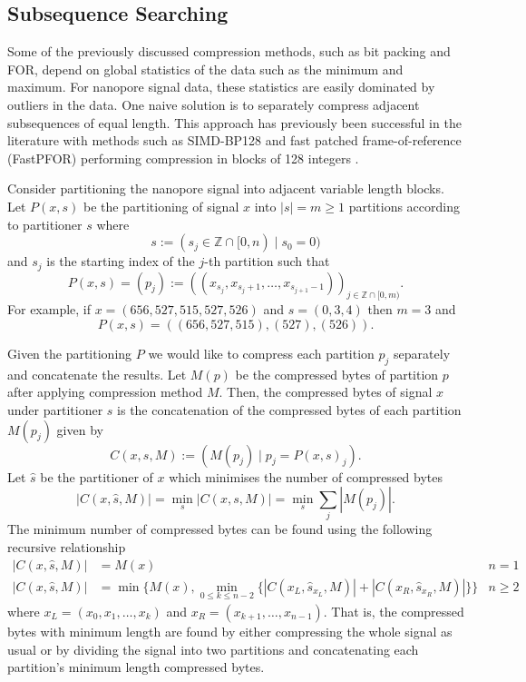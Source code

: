 \subsection{Subsequence Searching}
Some of the previously discussed compression methods, such as bit packing and FOR, depend on global statistics of the data such as the minimum and maximum.
For nanopore signal data, these statistics are easily dominated by outliers in the data.
One naive solution is to separately compress adjacent subsequences of equal length.
This approach has previously been successful in the literature with methods such as SIMD-BP128 and fast patched frame-of-reference (FastPFOR) performing compression in blocks of 128 integers \cite{lemire-simd}.


Consider partitioning the nanopore signal into adjacent variable length blocks.
Let $P(x,s)$ be the partitioning of signal $x$ into $|s|=m\ge 1$ partitions according to partitioner $s$ where
\[ s := (s_j \in \mathbb{Z}\cap [0, n) \mid s_0 = 0)\]
and $s_j$ is the starting index of the $j$-th partition such that
\[ P(x,s) = (p_j) := ((x_{s_j},x_{s_j+1},\dots,x_{s_{j+1}-1}))_{j\in\mathbb{Z}\cap[0,m)}.\]
For example, if $x=(656,527,515,527,526)$ and $s = (0,3,4)$ then $m=3$ and
\[P(x,s)=((656,527,515),(527),(526)).\]

Given the partitioning $P$ we would like to compress each partition $p_j$ separately and concatenate the results.
Let $M(p)$ be the compressed bytes of partition $p$ after applying compression method $M$.
Then, the compressed bytes of signal $x$ under partitioner $s$ is the concatenation of the compressed bytes of each partition $M(p_j)$ given by
\[ C(x,s,M) := (M(p_j)\mid p_j=P(x,s)_j). \]
Let $\hat s$ be the partitioner of $x$ which minimises the number of compressed bytes
\[ |C(x,\hat s,M)| = \min_s |C(x,s,M)| = \min_s \sum_j|M(p_j)|. \]
The minimum number of compressed bytes can be found using the following recursive relationship
\begin{align*}
	|C(x,\hat s,M)| &= M(x) & n = 1\\
	|C(x,\hat s,M)| &= \min\{M(x),\min_{0\le k\le n-2}\{|C(x_L,\hat s_{x_L},M)| + |C(x_R,\hat s_{x_R},M)|\}\} & n\ge 2
\end{align*}
where $x_L=(x_0,x_1,\dots,x_k)$ and $x_R=(x_{k+1},\dots,x_{n-1})$.
That is, the compressed bytes with minimum length are found by either compressing the whole signal as usual or by dividing the signal into two partitions and concatenating each partition's minimum length compressed bytes.

